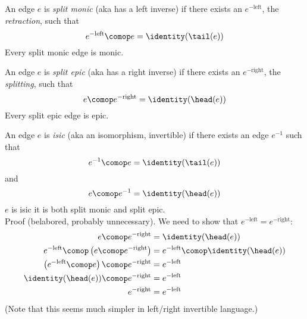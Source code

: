 \documentclass[11pt,openany]{book}
\let\oldfigure\figure%
\let\endoldfigure\endfigure%
\renewenvironment{figure}[1][htbp]%
  {\oldfigure[#1]\mdframed[backgroundcolor=GhostWhite,linecolor=GhostWhite]}
  {\endmdframed\endoldfigure}
\begin{document}
An edge $e$ is \textit{split monic} (aka has a left inverse)
if there exists an $e^{-\text{left}}$, the \textit{retraction},
such that
\[
e^{-\text{left}} \comop e = \identity(\tail(e))
\]
Every split monic edge is monic.

\begin{figure}
\centering
{}
\caption{Split epic edge $e$, if the two edge path
$V_1 \longrightarrow V_1$
composes to the identity loop.}
\label{fig:split_epic}
\end{figure}

An edge $e$ is \textit{split epic} (aka has a right inverse)
if there exists an $e^{-\text{right}}$, the \textit{splitting}, 
such that
\[
e \comop e^{-\text{right}} = \identity(\head(e))
\]
Every split epic edge is epic.

\begin{figure}
\centering
{}
\caption{Isic edge $e$, if both paths $V_0 \longrightarrow V_0$
are equivalent (compose to the identity loop) and the 
same for both paths $V_1 \longrightarrow V_1$.}
\label{fig:isic}
\end{figure}

An edge $e$ is \textit{isic} (aka an isomorphism, invertible)
if there exists an edge $e^{-1}$ such that
\[
e^{-1} \comop e = \identity(\tail(e))
\]
and
\[
e \comop e^{-1} = \identity(\head(e))
\]
$e$ is isic \liff it is both split monic and split epic.\\
Proof (belabored, probably unnecessary).
We need to show that $e^{-\text{left}} = e^{-\text{right}}$:
\begin{align*}
e \comop e^{-\text{right}} 
& = 
\identity(\head(e)) 
\\
e^{-\text{left}} \comop \left( e \comop e^{-\text{right}} \right)
& = 
e^{-\text{left}} \comop \identity(\head(e)) 
\\
\left( e^{-\text{left}} \comop e \right) \comop e^{-\text{right}} 
& = 
e^{-\text{left}}
\\
\identity(\head(e)) \comop e^{-\text{right}} 
& = 
e^{-\text{left}} 
\\
e^{-\text{right}} 
& = 
e^{-\text{left}} 
\end{align*}
(Note that this seems much simpler in left/right invertible language.)
\end{document}
